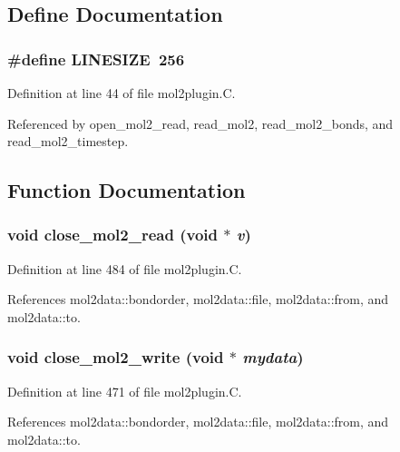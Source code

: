 \subsection{Define Documentation}
\subsubsection{\setlength{\rightskip}{0pt plus 5cm}\#define LINESIZE\ 256}\label{mol2plugin_8C_a0}




Definition at line 44 of file mol2plugin.C.

Referenced by open\_\-mol2\_\-read, read\_\-mol2, read\_\-mol2\_\-bonds, and read\_\-mol2\_\-timestep.

\subsection{Function Documentation}
\subsubsection{\setlength{\rightskip}{0pt plus 5cm}void close\_\-mol2\_\-read (void $\ast$ {\em v})\hspace{0.3cm}{\tt  [static]}}\label{mol2plugin_8C_a12}




Definition at line 484 of file mol2plugin.C.

References mol2data::bondorder, mol2data::file, mol2data::from, and mol2data::to.
\subsubsection{\setlength{\rightskip}{0pt plus 5cm}void close\_\-mol2\_\-write (void $\ast$ {\em mydata})\hspace{0.3cm}{\tt  [static]}}\label{mol2plugin_8C_a11}




Definition at line 471 of file mol2plugin.C.

References mol2data::bondorder, mol2data::file, mol2data::from, and mol2data::to.
